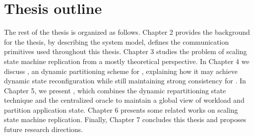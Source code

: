 \section{Thesis outline}
\label{sec:structure}

The rest of the thesis is organized as follows. Chapter 2 provides the
background for the thesis, by describing the system model, defines the
communication primitives used throughout this thesis. Chapter 3 studies the
problem of scaling state machine replication from a mostly theoretical
perspective. In Chapter 4 we discuss \dssmr, an dynamic partitioning scheme for
\smr, explaining how it may achieve dynamic state reconfiguration while still
maintaining strong consistency for \smr. In Chapter 5, we present \dynastar,
which combines the dynamic repartitioning state technique and the centralized
oracle to maintain a global view of workload and partition application state.
Chapter 6 presents some related works on scaling state machine replication.
Finally, Chapter 7 concludes this thesis and proposes future research
directions.
